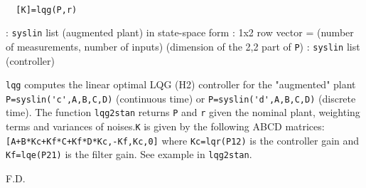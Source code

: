 \begin{mandesc}
   \\ %
\end{mandesc}
\begin{calling_sequence}
\begin{verbatim}
  [K]=lqg(P,r)  
\end{verbatim}
\end{calling_sequence}
\begin{parameters}
  \begin{varlist}
    : \verb!syslin! list (augmented plant) in state-space form
    : 1x2 row vector = (number of measurements, number of inputs)
    (dimension of the 2,2 part of \verb!P!)
    : \verb!syslin! list (controller)
  \end{varlist}
\end{parameters}
\begin{mandescription}
  \verb!lqg!  computes the linear optimal LQG (H2) controller for the
  "augmented" plant \verb!P=syslin('c',A,B,C,D)! (continuous time) or
  \verb!P=syslin('d',A,B,C,D)! (discrete time).  The function \verb!lqg2stan!
  returns \verb!P! and \verb!r! given the nominal plant, weighting terms and
  variances of noises.\verb!K! is given by the following ABCD matrices:
  \verb![A+B*Kc+Kf*C+Kf*D*Kc,-Kf,Kc,0]! where \verb!Kc=lqr(P12)!  is the
  controller gain and \verb!Kf=lqe(P21)! is the filter gain.  See example in
  \verb!lqg2stan!.
\end{mandescription}
\begin{manseealso}
        
\end{manseealso}
\begin{authors}
  F.D.  
\end{authors}
